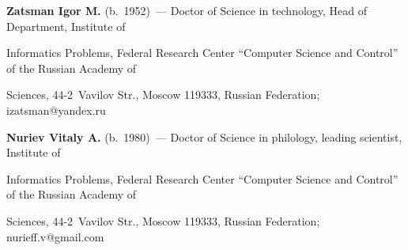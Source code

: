 \textbf{Zatsman Igor M.} (b.\ 1952)~--- Doctor of Science in technology, Head of Department, Institute of 


Informatics Problems, Federal Research Center ``Computer Science and Control'' of the Russian Academy of 


Sciences, 44-2~Vavilov Str., Moscow 119333, Russian Federation; \mbox{izatsman@yandex.ru}





\vspace*{3pt}





\noindent


\textbf{Nuriev Vitaly A.} (b.\ 1980)~--- Doctor of Science in philology, leading scientist, Institute of 


Informatics Problems, Federal Research Center ``Computer Science and Control'' of the Russian Academy of 


Sciences, 44-2~Vavilov Str., Moscow 119333, Russian Federation; \mbox{nurieff.v@gmail.com}








\label{end\stat}





\renewcommand{\bibname}{\protect\rm Литература} 


